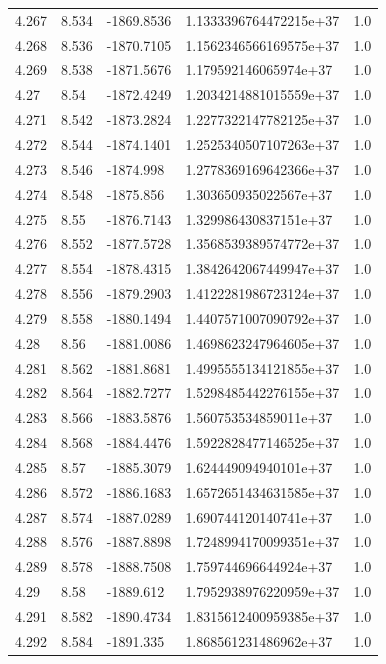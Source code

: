\begin{tabular}{lllll}
4.267 & 8.534 & -1869.8536 & 1.1333396764472215e+37 & 1.0 \\
4.268 & 8.536 & -1870.7105 & 1.1562346566169575e+37 & 1.0 \\
4.269 & 8.538 & -1871.5676 & 1.179592146065974e+37 & 1.0 \\
4.27 & 8.54 & -1872.4249 & 1.2034214881015559e+37 & 1.0 \\
4.271 & 8.542 & -1873.2824 & 1.2277322147782125e+37 & 1.0 \\
4.272 & 8.544 & -1874.1401 & 1.2525340507107263e+37 & 1.0 \\
4.273 & 8.546 & -1874.998 & 1.2778369169642366e+37 & 1.0 \\
4.274 & 8.548 & -1875.856 & 1.303650935022567e+37 & 1.0 \\
4.275 & 8.55 & -1876.7143 & 1.329986430837151e+37 & 1.0 \\
4.276 & 8.552 & -1877.5728 & 1.3568539389574772e+37 & 1.0 \\
4.277 & 8.554 & -1878.4315 & 1.3842642067449947e+37 & 1.0 \\
4.278 & 8.556 & -1879.2903 & 1.4122281986723124e+37 & 1.0 \\
4.279 & 8.558 & -1880.1494 & 1.4407571007090792e+37 & 1.0 \\
4.28 & 8.56 & -1881.0086 & 1.4698623247964605e+37 & 1.0 \\
4.281 & 8.562 & -1881.8681 & 1.4995555134121855e+37 & 1.0 \\
4.282 & 8.564 & -1882.7277 & 1.5298485442276155e+37 & 1.0 \\
4.283 & 8.566 & -1883.5876 & 1.560753534859011e+37 & 1.0 \\
4.284 & 8.568 & -1884.4476 & 1.5922828477146525e+37 & 1.0 \\
4.285 & 8.57 & -1885.3079 & 1.624449094940101e+37 & 1.0 \\
4.286 & 8.572 & -1886.1683 & 1.6572651434631585e+37 & 1.0 \\
4.287 & 8.574 & -1887.0289 & 1.690744120140741e+37 & 1.0 \\
4.288 & 8.576 & -1887.8898 & 1.7248994170099351e+37 & 1.0 \\
4.289 & 8.578 & -1888.7508 & 1.759744696644924e+37 & 1.0 \\
4.29 & 8.58 & -1889.612 & 1.7952938976220959e+37 & 1.0 \\
4.291 & 8.582 & -1890.4734 & 1.8315612400959385e+37 & 1.0 \\
4.292 & 8.584 & -1891.335 & 1.868561231486962e+37 & 1.0 \\

\end{tabular}
